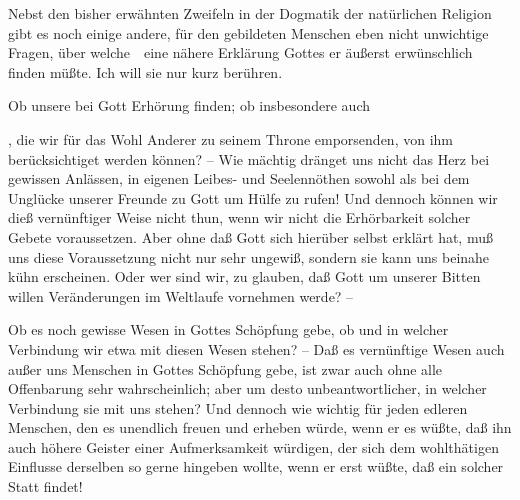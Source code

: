 Nebst den bisher erwähnten Zweifeln in der Dogmatik der natürlichen Religion gibt es noch einige andere, für den gebildeten Menschen eben nicht unwichtige Fragen, über welche~\ eine nähere Erklärung Gottes er äußerst erwünschlich finden müßte. Ich will sie nur kurz berühren.
\begin{aufza}
\item Ob unsere  bei Gott Erhörung finden; ob insbesondere auch
\item {}, die wir für das Wohl Anderer zu seinem Throne emporsenden, von ihm berücksichtiget werden können? -- Wie mächtig dränget uns nicht das Herz bei gewissen Anlässen, in eigenen Leibes- und Seelennöthen sowohl als bei dem Unglücke unserer Freunde zu Gott um Hülfe zu rufen! Und dennoch können wir dieß vernünftiger Weise nicht thun, wenn wir nicht die Erhörbarkeit solcher Gebete voraussetzen. Aber ohne daß Gott sich hierüber selbst erklärt hat, muß uns diese Voraussetzung nicht nur sehr ungewiß, sondern sie kann uns beinahe kühn erscheinen. Oder wer sind wir, zu glauben, daß Gott um unserer Bitten willen Veränderungen im Weltlaufe vornehmen werde? --
\item Ob es noch  gewisse  Wesen in Gottes Schöpfung gebe, ob und in welcher Verbindung wir etwa mit diesen Wesen stehen? -- Daß es vernünftige Wesen auch außer uns Menschen in Gottes Schöpfung gebe, ist zwar auch ohne alle Offenbarung sehr wahrscheinlich; aber um desto unbeantwortlicher, in welcher Verbindung sie mit uns stehen? Und dennoch wie wichtig für jeden edleren Menschen, den es unendlich freuen und erheben würde, wenn er es wüßte, daß ihn auch höhere Geister einer Aufmerksamkeit würdigen, der sich dem wohlthätigen Einflusse derselben so gerne hingeben wollte, wenn er erst wüßte, daß ein solcher Statt findet!

\end{aufza}
